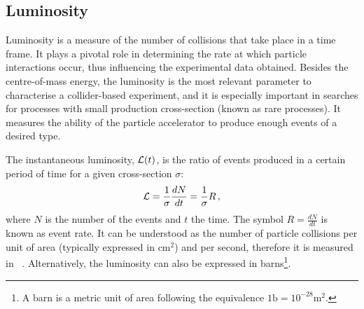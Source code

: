 









\subsection{Luminosity}
\label{sec:Chap1:LHC:Cross-Luminosity}
Luminosity is a measure of the number of collisions that take place in a time frame.
It plays a pivotal role in determining the rate at which particle interactions occur, 
thus influencing the experimental data obtained.
Besides the centre-of-mass energy, the luminosity is the most relevant parameter to characterise
a collider-based experiment, and it is especially 
important in searches for processes with small production cross-section
(known as rare processes).
It measures the ability of the particle accelerator to produce enough events of a desired type.

The instantaneous luminosity, $\mathcal{L}(t)$, is the ratio of events produced in a 
certain period of time for a given cross-section $\sigma$:
\begin{equation*}
\mathcal{L} = \frac{1}{\sigma}\frac{dN}{dt} = \frac{1}{\sigma} R \, ,
\end{equation*}
where $N$ is the number of the events and $t$ the time. The symbol $R=\frac{dN}{dt}$ is 
known as event rate. It can be understood as the number of particle collisions per 
unit of area (typically expressed in cm$^2$) and per second, therefore it is 
measured in \lumiunits~\cite{Herr:941318}.  Alternatively, the luminosity
can also be expressed in barns\footnote{A barn is a metric unit of area following the equivalence
$1\text{b}=10^{-28}\text{m}^2$.}.
 
